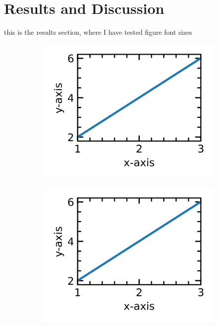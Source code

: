 \documentclass[12pt,a4paper,twoside]{article}
\numberwithin{equation}{section}
\renewcommand{\_}{\textscale{.7}{\textunderscore}}
\begin{document}
\section{Results and Discussion}
this is the results section, where I have tested figure font sizes
\begin{figure}[H]
	\centering
	\begin{subfigure}{0.325\linewidth}
		\includegraphics[width=1.0\linewidth]{3x3.png}
	\end{subfigure}
    \begin{subfigure}{0.325\linewidth}
		\includegraphics[width=1.0\linewidth]{3x3.png}
	\end{subfigure}

\end{figure}
\end{document}
